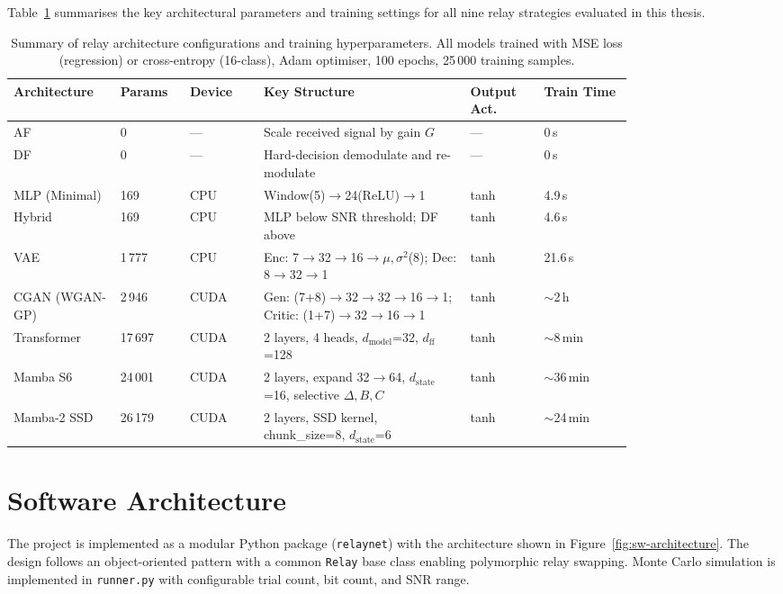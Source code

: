 Table~\ref{tbl:arch-summary} summarises the key architectural parameters and training
settings for all nine relay strategies evaluated in this thesis.

\begin{table}[H]
\centering
\caption{Summary of relay architecture configurations and training hyperparameters.
All models trained with MSE loss (regression) or cross-entropy (16-class), Adam
optimiser, 100 epochs, 25\,000 training samples.}
\label{tbl:arch-summary}
\small
\begin{tabular}{@{}p{0.12\linewidth}p{0.08\linewidth}p{0.10\linewidth}p{0.28\linewidth}p{0.10\linewidth}p{0.12\linewidth}@{}}
\toprule
\textbf{Architecture} & \textbf{Params} & \textbf{Device} & \textbf{Key Structure} & \textbf{Output Act.} & \textbf{Train Time} \\
\midrule
AF & 0 & --- & Scale received signal by gain $G$ & --- & 0\,s \\
DF & 0 & --- & Hard-decision demodulate and re-modulate & --- & 0\,s \\
MLP (Minimal) & 169 & CPU & Window(5)$\to$24(ReLU)$\to$1 & tanh & 4.9\,s \\
Hybrid & 169 & CPU & MLP below SNR threshold; DF above & tanh & 4.6\,s \\
VAE & 1\,777 & CPU & Enc: 7$\to$32$\to$16$\to$\(\mu,\sigma^2\)(8); Dec: 8$\to$32$\to$1 & tanh & 21.6\,s \\
CGAN (WGAN-GP) & 2\,946 & CUDA & Gen: (7+8)$\to$32$\to$32$\to$16$\to$1; Critic: (1+7)$\to$32$\to$16$\to$1 & tanh & $\sim$2\,h \\
Transformer & 17\,697 & CUDA & 2 layers, 4 heads, $d_\text{model}$=32, $d_\text{ff}$=128 & tanh & $\sim$8\,min \\
Mamba S6 & 24\,001 & CUDA & 2 layers, expand 32$\to$64, $d_\text{state}$=16, selective $\Delta,B,C$ & tanh & $\sim$36\,min \\
Mamba-2 SSD & 26\,179 & CUDA & 2 layers, SSD kernel, chunk\_size=8, $d_\text{state}$=6 & tanh & $\sim$24\,min \\
\bottomrule
\end{tabular}
\end{table}

\section{Software Architecture}\label{sec:appendix-c-software-architecture}

The project is implemented as a modular Python package (\texttt{relaynet}) with the
architecture shown in Figure~\ref{fig:sw-architecture}. The design follows an
object-oriented pattern with a common \texttt{Relay} base class enabling polymorphic
relay swapping. Monte Carlo simulation is implemented in \texttt{runner.py} with
configurable trial count, bit count, and SNR range.

